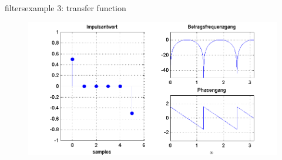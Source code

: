 	\begin{frame}{filters}{example 3: transfer function}
		\begin{figure}
			\centerline{\includegraphics[scale=.5]{graph/fx_03}}
		    \label{fig:fx_03}
		\end{figure}
	\end{frame}	
	
